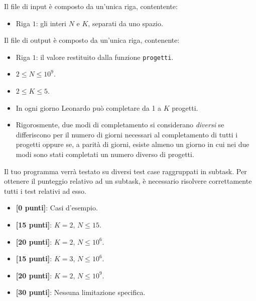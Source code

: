 Il file di input è composto da un'unica riga, contentente:

\begin{itemize}[nolistsep,itemsep=2mm]
    \item Riga $1$: gli interi $N$ e $K$, separati da uno spazio.
\end{itemize}

Il file di output è composto da un'unica riga, contenente:
\begin{itemize}[nolistsep,itemsep=2mm]
    \item Riga $1$: il valore restituito dalla funzione \texttt{progetti}.
\end{itemize}


\Constraints

\begin{itemize}[nolistsep, itemsep=2mm]
\item $2 \le N \le 10^9$.
\item $2 \le K \le 5$.
\item In ogni giorno Leonardo può completare da 1 a $K$ progetti.
\item Rigorosmente, due modi di completamento si considerano \emph{diversi} se differiscono per il numero di giorni necessari al completamento di tutti i progetti oppure se, a parità di giorni, esiste almeno un giorno in cui nei due modi sono stati completati un numero diverso di progetti. 
\end{itemize}

\Scoring
Il tuo programma verrà testato su diversi test case raggruppati in subtask.
Per ottenere il punteggio relativo ad un subtask, è necessario risolvere
correttamente tutti i test relativi ad esso.
\begin{itemize}[nolistsep,itemsep=2mm]
\item \textbf{ [\phantom{0}0 punti]}: Casi d'esempio.
\item \textbf{ [15 punti]}: $K = 2$, $N \le 15$.
\item \textbf{ [20 punti]}: $K = 2$, $N \le 10^6$.
\item \textbf{ [15 punti]}: $K = 3$, $N \le 10^6$.
\item \textbf{ [20 punti]}: $K = 2$, $N \le 10^9$.
\item \textbf{ [30 punti]}: Nessuna limitazione specifica.
\end{itemize}

